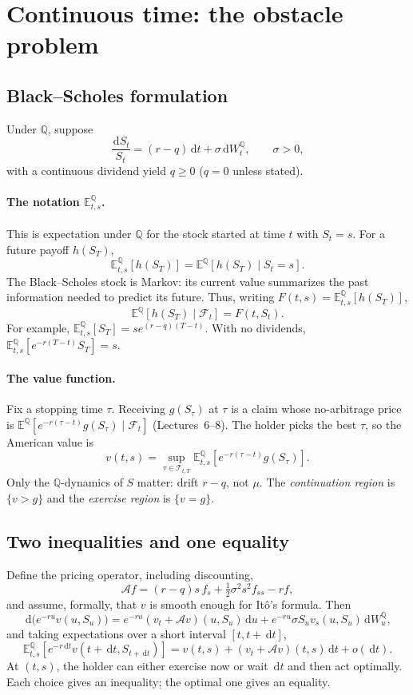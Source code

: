 \documentclass[10pt]{article}
\newcommand{\E}{\mathbb E}
\newcommand{\Q}{\mathbb Q}
\newcommand{\1}{\mathbf 1}
\newcommand{\cF}{\mathcal F}
\newcommand{\dd}{\,\mathrm d}
\theoremstyle{definition}
\begin{document}
\section{Continuous time: the obstacle problem}

\subsection{Black--Scholes formulation}

Under \(\Q\), suppose
\[
\frac{\dd S_t}{S_t}=(r-q)\dd t+\sigma\dd W_t^\Q,
\qquad\sigma>0,
\]
with a continuous dividend yield \(q\geq0\) (\(q=0\) unless stated).

\paragraph{The notation \(\E^\Q_{t,s}\).}
This is expectation under \(\Q\) for the stock started at time \(t\)
with \(S_t=s\). For a future payoff \(h(S_T)\),
\[
\E^\Q_{t,s}[h(S_T)]=\E^\Q[h(S_T)\mid S_t=s].
\]
The Black--Scholes stock is Markov: its current value summarizes the past
information needed to predict its future. Thus, writing
\(F(t,s)=\E^\Q_{t,s}[h(S_T)]\),
\[
\E^\Q[h(S_T)\mid\cF_t]=F(t,S_t).
\]
For example, \(\E^\Q_{t,s}[S_T]=s e^{(r-q)(T-t)}\). With no dividends,
\(\E^\Q_{t,s}[e^{-r(T-t)}S_T]=s\).

\paragraph{The value function.}
Fix a stopping time \(\tau\). Receiving \(g(S_\tau)\) at \(\tau\) is a claim
whose no-arbitrage price is \(\E^\Q[e^{-r(\tau-t)}g(S_\tau)\mid\cF_t]\)
(Lectures~6--8). The holder picks the best \(\tau\), so the American value is
\[
\boxed{
v(t,s)=\sup_{\tau\in\mathcal T_{t,T}}
\E^\Q_{t,s}[e^{-r(\tau-t)}g(S_\tau)].}
\]
Only the \(\Q\)-dynamics of \(S\) matter: drift \(r-q\), not \(\mu\). The
\emph{continuation region} is \(\{v>g\}\) and the \emph{exercise region}
is \(\{v=g\}\).

\subsection{Two inequalities and one equality}

Define the pricing operator, including discounting,
\[
\mathcal Af=(r-q)s\,f_s+\tfrac12\sigma^2s^2f_{ss}-rf,
\]
and assume, formally, that \(v\) is smooth enough for It\^o's formula. Then
\[
\dd\bigl(e^{-ru}v(u,S_u)\bigr)
=e^{-ru}(v_t+\mathcal Av)(u,S_u)\dd u
+e^{-ru}\sigma S_uv_s(u,S_u)\dd W_u^\Q,
\]
and taking expectations over a short interval \([t,t+\dd t]\),
\[
\E^\Q_{t,s}\!\left[e^{-r\dd t}v(t+\dd t,S_{t+\dd t})\right]
=v(t,s)+(v_t+\mathcal Av)(t,s)\dd t+o(\dd t).
\]
At \((t,s)\), the holder can either exercise now or wait \(\dd t\) and then
act optimally. Each choice gives an inequality; the optimal one gives an
equality.
\end{document}
